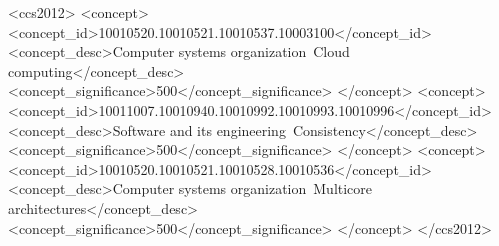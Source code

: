 \author[Vasilis Gavrielatos,  Vijay Nagarajan, Panagiota Fatourou]
{Vasilis Gavrielatos,  Vijay Nagarajan, Panagiota Fatourou$^{*}$}

\begin{CCSXML}
<ccs2012>
   <concept>
       <concept_id>10010520.10010521.10010537.10003100</concept_id>
       <concept_desc>Computer systems organization~Cloud computing</concept_desc>
       <concept_significance>500</concept_significance>
       </concept>
   <concept>
       <concept_id>10011007.10010940.10010992.10010993.10010996</concept_id>
       <concept_desc>Software and its engineering~Consistency</concept_desc>
       <concept_significance>500</concept_significance>
       </concept>
   <concept>
       <concept_id>10010520.10010521.10010528.10010536</concept_id>
       <concept_desc>Computer systems organization~Multicore architectures</concept_desc>
       <concept_significance>500</concept_significance>
       </concept>
 </ccs2012>
\end{CCSXML}


